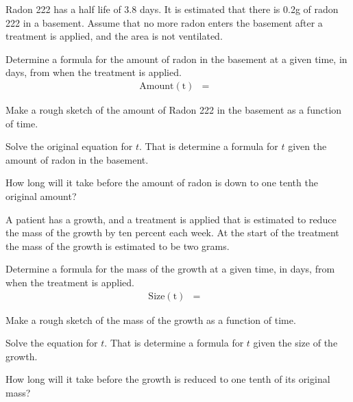 \begin{problem}
\item Radon 222 has a half life of 3.8 days. It is estimated that
  there is 0.2g of radon 222 in a basement. Assume that no more
  radon enters the basement after a treatment is applied, and the area
  is not ventilated.
  \begin{subproblem}
    \item Determine a formula for the amount of radon in the basement
      at a given time, in days, from when the treatment is applied.
      \begin{eqnarray*}
        \mathrm{Amount(t)} & = &
      \end{eqnarray*}
    \item Make a rough sketch of the amount of Radon 222 in the
      basement as a function of time.
      \vfill
    \item Solve the original equation for $t$. That is determine a
      formula for $t$ given the amount of radon in the basement.
      \vfill
    \item How long will it take before the amount of radon is down to
      one tenth the original amount?
      \vfill
  \end{subproblem}

\clearpage

\item \label{question:massOfGrowth} A patient has a growth, and a
  treatment is applied that is estimated to reduce the mass of the
  growth by ten percent each week. At the start of the treatment the
  mass of the growth is estimated to be two grams.
  \begin{subproblem}
  \item Determine a formula for the mass of the growth at a given
    time, in days, from when the treatment is applied.
      \begin{eqnarray*}
        \mathrm{Size(t)} & = &
      \end{eqnarray*}
      \vfill
      \vfill
    \item Make a rough sketch of the mass of the growth as a function
      of time.
      
      \vfill
      \clearpage
      
    \item Solve the equation for $t$. That is determine a formula for
      $t$ given the size of the growth.
      
      \vfill
      
    \item How long will it take before the growth is reduced to one
      tenth of its original mass?

      \vfill
      
  \end{subproblem}


\end{problem}


